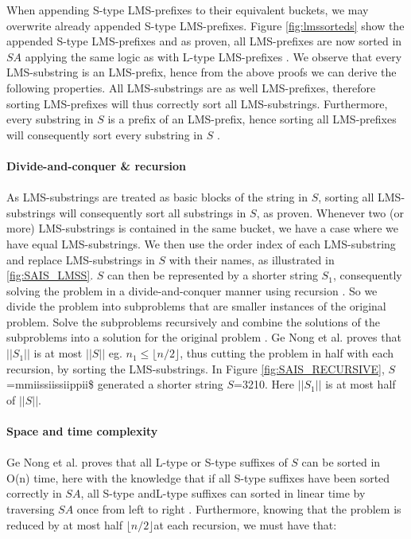 \documentclass[12pt]{article} %
\begin{document}
When appending S-type LMS-prefixes to their equivalent buckets, we may overwrite already appended S-type LMS-prefixes. Figure \ref{fig:lmssorteds} show the appended S-type LMS-prefixes and as proven, all LMS-prefixes are now sorted in $SA$ applying the same logic as with L-type LMS-prefixes \cite{twoeffecient}. We observe that every LMS-substring is an LMS-prefix, hence from the above proofs we can derive the following properties. All LMS-substrings are as well LMS-prefixes, therefore sorting LMS-prefixes will thus correctly sort all LMS-substrings. Furthermore, every substring in $S$ is a prefix of an LMS-prefix, hence sorting all LMS-prefixes will consequently sort every substring in $S$ \cite{twoeffecient}.
\\ \\
\textbf{Divide-and-conquer \& recursion}
\\ \\
As LMS-substrings are treated as basic blocks of the string in $S$, sorting all LMS-substrings will consequently sort all substrings in $S$, as proven. Whenever two (or more) LMS-substrings is contained in the same bucket, we have a case where we have equal LMS-substrings. We then use the order index of each LMS-substring and replace LMS-substrings in $S$ with their names, as illustrated in \ref{fig:SAIS_LMSS}. $S$ can then be represented by a shorter string $S_1$, consequently solving the problem in a divide-and-conquer manner using recursion \cite{twoeffecient}. So we divide the problem into subproblems that are smaller instances of the original problem. Solve the subproblems recursively and combine the solutions of the subproblems into a solution for the original problem \cite{introduction}.
Ge Nong et al. \cite{twoeffecient} proves that $||S_1||$ is at most $||S||$ eg. $n_1 \leq \lfloor n/2 \rfloor$, thus cutting the problem in half with each recursion, by sorting the LMS-substrings. In Figure \ref{fig:SAIS_RECURSIVE}, $S$=mmiissiissiippii\$ generated a shorter string $S$=3210. Here $||S_1||$ is at most half of $||S||$.
\\ \\
\textbf{Space and time complexity}
\\ \\
Ge Nong et al. \cite{twoeffecient} proves that all L-type or S-type suffixes of $S$ can be sorted in O(n) time, here with the knowledge that if all S-type suffixes have been sorted correctly in $SA$, all S-type andL-type suffixes can sorted in linear time by traversing $SA$ once from left to right \cite{twoeffecient}. Furthermore, knowing that the problem is reduced by at most half  $\lfloor n/2 \rfloor$at each recursion, we must have that:
\end{document}
